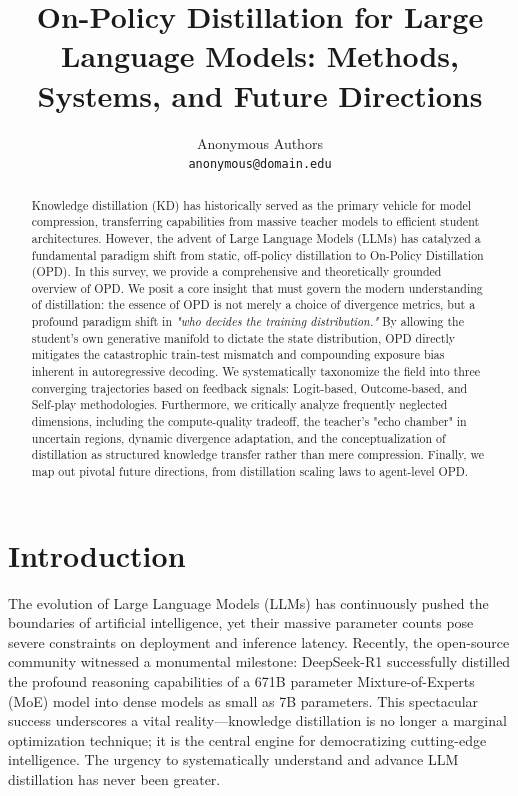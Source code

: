\documentclass{article}
\title{On-Policy Distillation for Large Language Models: Methods, Systems, and Future Directions}
\author{
Anonymous Authors \\
\texttt{anonymous@domain.edu}
}
\begin{document}
\maketitle

\begin{abstract}
Knowledge distillation (KD) has historically served as the primary vehicle for model compression, transferring capabilities from massive teacher models to efficient student architectures. However, the advent of Large Language Models (LLMs) has catalyzed a fundamental paradigm shift from static, off-policy distillation to On-Policy Distillation (OPD). In this survey, we provide a comprehensive and theoretically grounded overview of OPD. We posit a core insight that must govern the modern understanding of distillation: the essence of OPD is not merely a choice of divergence metrics, but a profound paradigm shift in \textit{"who decides the training distribution."} By allowing the student's own generative manifold to dictate the state distribution, OPD directly mitigates the catastrophic train-test mismatch and compounding exposure bias inherent in autoregressive decoding. 
We systematically taxonomize the field into three converging trajectories based on feedback signals: Logit-based, Outcome-based, and Self-play methodologies. Furthermore, we critically analyze frequently neglected dimensions, including the compute-quality tradeoff, the teacher's "echo chamber" in uncertain regions, dynamic divergence adaptation, and the conceptualization of distillation as structured knowledge transfer rather than mere compression. Finally, we map out pivotal future directions, from distillation scaling laws to agent-level OPD.
\end{abstract}

\section{Introduction}
\label{sec:intro}

The evolution of Large Language Models (LLMs) has continuously pushed the boundaries of artificial intelligence, yet their massive parameter counts pose severe constraints on deployment and inference latency. Recently, the open-source community witnessed a monumental milestone: DeepSeek-R1 \citep{2501.12948} successfully distilled the profound reasoning capabilities of a 671B parameter Mixture-of-Experts (MoE) model into dense models as small as 7B parameters. This spectacular success underscores a vital reality—knowledge distillation is no longer a marginal optimization technique; it is the central engine for democratizing cutting-edge intelligence. The urgency to systematically understand and advance LLM distillation has never been greater.
\end{document}
